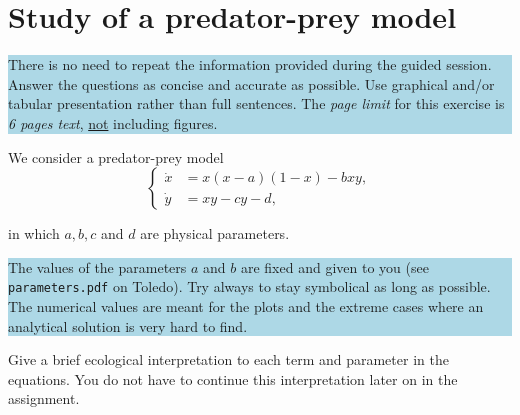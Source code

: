 \chapter{Study of a predator-prey model}

\begin{center}
\colorbox{LightBlue}{\parbox{1\textwidth}{ There is no need to repeat the information provided during the guided session. Answer the questions as concise and accurate as possible. Use graphical and/or tabular presentation rather than full sentences. The \textit{page limit} 
for this exercise is \textit{6 pages text}, \underline{not} including figures.}}
\end{center}

We consider a predator-prey model
\begin{equation*}
\left\{
    \begin{aligned}
        \dot{x} &= x (x - a) (1 - x) - b x y, \\
        \dot{y} &= xy - cy - d,
    \end{aligned}
\right.
\end{equation*}

in which $a, b, c$ and $d$ are physical parameters.

\begin{center}
\colorbox{LightBlue}{\parbox{1\textwidth}{\noindent The values of the para\-meters $a$ and $b$ are fixed and given to you (see \texttt{parameters.pdf} on Toledo). Try always to stay symbolical as long as possible. The numerical values are meant for the plots and the extreme cases where an analytical solution is very hard to find.}}
\end{center}

\noindent Give a brief ecological interpretation to each term and parameter in the equations. You do not have to continue this interpretation later on in the assignment.


